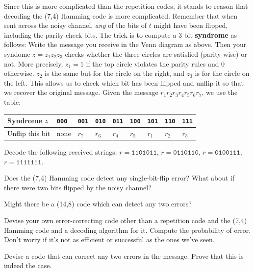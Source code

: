 \documentclass{article}
\begin{document}
Since this is more complicated than the repetition codes, it stands to reason that decoding the (7,4) Hamming code is more complicated.
Remember that when sent across the noisy channel, \textit{any} of the bits of \(t\) might have been flipped, including the parity check bits.
The trick is to compute a 3-bit \textbf{syndrome} as follows:
Write the message you receive in the Venn diagram as above.
Then your syndome \(z = z_1z_2z_3\) checks whether the three circles are satisfied (parity-wise) or not.
More precisely, \(z_1=1\) if the top circle violates the parity rules and 0 otherwise. \(z_2\) is the same but for the circle on the right, and \(z_3\) is for the circle on the left.
This allows us to check which bit has been flipped and unflip it so that we recover the original message.
Given the message \(r_1r_2r_3r_4r_5r_6r_7\), we use the table:
\begin{table}[h!]
    \begin{center}
        \begin{tabular}{l|llllllll}
            Syndrome \(z\) &\texttt{000} &\texttt{001} &\texttt{010} &\texttt{011} &\texttt{100} &\texttt{101} &\texttt{110} &\texttt{111} \\\hline
            Unflip this bit & none & \(r_7\) & \(r_6\) & \(r_4\) & \(r_5\) & \(r_1\) & \(r_2\) & \(r_3\)
        \end{tabular}
    \end{center}
\end{table}

\begin{exercise}
    Decode the following received strings: \(r = \texttt{1101011}\), \(r = \texttt{0110110}\), \(r = \texttt{0100111}\), \(r = \texttt{1111111}\).
\end{exercise}

\begin{exercise}
    Does the (7,4) Hamming code detect any single-bit-flip error? 
    What about if there were two bits flipped by the noisy channel? 
\end{exercise}

\begin{exercise}
    Might there be a (14,8) code which can detect any two errors?
\end{exercise}

\begin{exercise}
    Devise your own error-correcting code other than a repetition code and the (7,4) Hamming code and a decoding algorithm for it.
    Compute the probability of error.
    Don't worry if it's not as efficient or successful as the ones we've seen.
\end{exercise}

\begin{exercise}
    Devise a code that can correct any two errors in the message.
    Prove that this is indeed the case.
\end{exercise}
\end{document}
